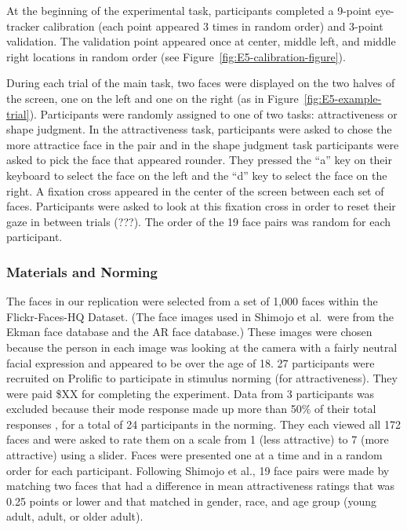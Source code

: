 \documentclass[
  man,floatsintext]{apa6}
\begin{document}
At the beginning of the experimental task, participants completed a
9-point eye-tracker calibration (each point appeared 3 times in random
order) and 3-point validation. The validation point appeared once at
center, middle left, and middle right locations in random order (see Figure~\ref{fig:E5-calibration-figure}).

During each trial of the main task, two faces were displayed on the two
halves of the screen, one on the left and one on the right (as in Figure~\ref{fig:E5-example-trial}). Participants were randomly assigned to one of two tasks:
attractiveness or shape judgment. In the attractiveness task,
participants were asked to chose the more attractice face in the pair
and in the shape judgment task participants were asked to pick the face
that appeared rounder. They pressed the ``a'' key on their keyboard to
select the face on the left and the ``d'' key to select the face on the
right. A fixation cross appeared in the center of the screen between
each set of faces. Participants were asked to look at this fixation
cross in order to reset their gaze in between trials (???). The order of
the 19 face pairs was random for each participant.

\hypertarget{materials-and-norming}{%
\subsubsection{Materials and Norming}\label{materials-and-norming}}

The faces in our replication were selected from a set of 1,000 faces
within the Flickr-Faces-HQ Dataset. (The face images used in Shimojo et
al.~were from the Ekman face database and the AR face database.) These
images were chosen because the person in each image was looking at the
camera with a fairly neutral facial expression and appeared to be over
the age of 18. 27 participants were recruited on Prolific to participate
in stimulus norming (for attractiveness). They were paid \$XX for
completing the experiment. Data from 3 participants was excluded because
their mode response made up more than 50\% of their total responses
, for a total of 24 participants
in the norming. They each viewed all 172 faces and were asked to rate
them on a scale from 1 (less attractive) to 7 (more attractive) using a
slider. Faces were presented one at a time and in a random order for
each participant. Following Shimojo et al., 19 face pairs were made by
matching two faces that had a difference in mean attractiveness ratings
that was 0.25 points or lower and that matched in gender, race, and age
group (young adult, adult, or older adult).
\end{document}
